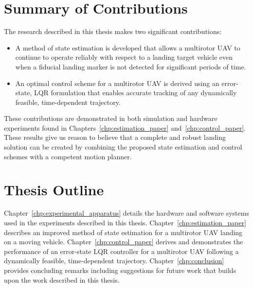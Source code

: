 \section{Summary of Contributions}
The research described in this thesis makes two significant contributions:
\begin{itemize}
\item A method of state estimation is developed that allows a multirotor UAV to
  continue to operate reliably with respect to a landing target vehicle even when a
  fiducial landing marker is not detected for significant periods of time.
\item An optimal control scheme for a multirotor UAV is derived using an error-state,
  LQR formulation that enables accurate tracking of any dynamically feasible,
  time-dependent trajectory.
\end{itemize}

These contributions are demonstrated in both simulation and hardware
experiments found in Chapters~\ref{chp:estimation_paper}
and~\ref{chp:control_paper}. These results 
give us reason to believe that a
complete and robust landing solution can be created by combining the proposed
state estimation and control schemes with a competent motion planner.

\section{Thesis Outline}

Chapter~\ref{chp:experimental_apparatus} details the hardware and software
systems used
in the experiments described in this thesis.
Chapter~\ref{chp:estimation_paper}
describes an improved method of state estimation for a multirotor UAV landing on
a moving vehicle.
Chapter~\ref{chp:control_paper} derives and demonstrates the performance of
an error-state LQR controller for a
multirotor UAV following a dynamically feasible, time-dependent trajectory.
Chapter~\ref{chp:conclusion} provides concluding remarks including
suggestions for future work that builds upon the work described in this
thesis.
